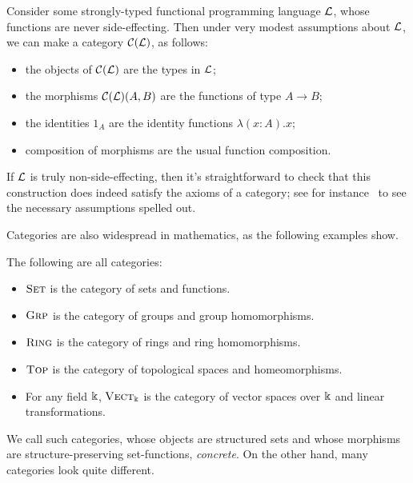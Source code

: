 \begin{ex}\label{ex:functional programming}
  Consider some strongly-typed functional programming language $\mathcal{L}$, whose functions
  are never side-effecting. Then under very modest assumptions about $\mathcal{L}$, we
  can make a category $\mathcal{C}(\mathcal{L})$, as follows:
  \begin{itemize}
    \item the objects of $\mathcal{C}(\mathcal{L})$ are the types in $\mathcal{L}$;
    \item the morphisms $\mathcal{C}(\mathcal{L})(A, B)$ are the functions of type $A\to B$;
    \item the identities $1_A$ are the identity functions $\lambda (x: A).x$;
    \item composition of morphisms are the usual function composition.
  \end{itemize}

  If $\mathcal{L}$ is truly non-side-effecting, then it's straightforward to check
  that this construction does indeed satisfy the axioms of a category; see for
  instance~\cite[Section 2.2]{barr-wells-1990} to see the necessary assumptions
  spelled out.
\end{ex}

\noindent
Categories are also widespread in mathematics, as the following examples show.

\begin{ex}\label{ex:concrete categories}The following are all categories:
	\begin{itemize}
		\item ${\textsc{\text{Set}}}$ is the category of sets and functions.
		\item ${\textsc{\text{Grp}}}$ is the category of groups and group homomorphisms.
		\item ${\textsc{\text{Ring}}}$ is the category of rings and ring homomorphisms.
		\item ${\textsc{\text{Top}}}$ is the category of topological spaces and homeomorphisms.
		\item For any field $\Bbbk$, ${\textsc{\text{Vect}}}_\Bbbk$ is the category of vector
		      spaces over $\Bbbk$ and linear transformations.
	\end{itemize}
\end{ex}

\noindent
We call such categories, whose objects are structured sets and whose morphisms
are structure-preserving set-functions, \emph{concrete}. On the other hand, many
categories look quite different.

